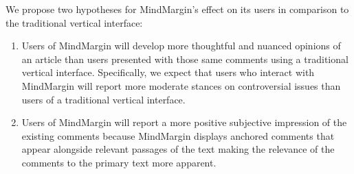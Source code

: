 



We propose two hypotheses for MindMargin's effect on its users in comparison to the traditional vertical interface:
\begin{enumerate}
\item Users of MindMargin will develop more thoughtful and nuanced opinions of an article than users presented with those same comments using a traditional vertical interface. %
Specifically, we expect that users who interact with MindMargin will report more moderate stances on controversial issues than users of a traditional vertical interface.
\item Users of MindMargin will report a more positive subjective impression of the existing comments because MindMargin displays anchored comments that appear alongside relevant passages of the text making the relevance of the comments to the primary text more apparent.
\end{enumerate}


